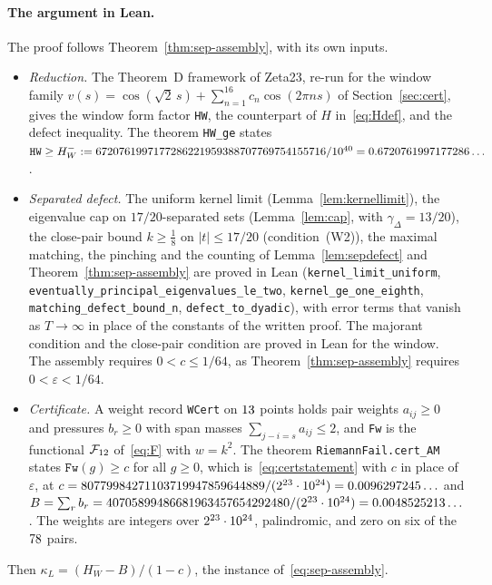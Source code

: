 \documentclass[11pt]{article}
\theoremstyle{definition}
\newcommand{\Fr}{\mathcal{F}}
\newcommand{\eps}{\varepsilon}
\begin{document}
\begin{sloppypar}
\paragraph{The argument in Lean.}
The proof follows Theorem~\ref{thm:sep-assembly}, with its own inputs.
\begin{itemize}
\item \emph{Reduction.} The Theorem~D framework of Zeta23, re-run for the
window family $v(s)=\cos(\sqrt2\,s)+\sum_{n=1}^{16}c_n\cos(2\pi ns)$ of
Section~\ref{sec:cert}, gives the window form factor \texttt{HW}, the
counterpart of $H$ in~\eqref{eq:Hdef}, and the defect inequality. The theorem
\texttt{HW\_ge} states $\texttt{HW}\ge H_W^-:=6720761997177286221959388707769754155716/10^{40}=0.6720761997177286\ldots$.
\item \emph{Separated defect.} The uniform kernel limit
(Lemma~\ref{lem:kernellimit}), the eigenvalue cap on $17/20$-separated sets
(Lemma~\ref{lem:cap}, with $\gamma_\Delta=13/20$), the close-pair bound
$k\ge\tfrac18$ on $|t|\le17/20$ (condition~(W2)), the maximal matching, the
pinching and the counting of Lemma~\ref{lem:sepdefect} and
Theorem~\ref{thm:sep-assembly} are proved in Lean
(\texttt{kernel\_limit\_uniform},
\texttt{eventually\_\allowbreak principal\_\allowbreak eigenvalues\_\allowbreak le\_two},
\texttt{kernel\_ge\_one\_eighth}, \texttt{matching\_defect\_bound\_n},
\texttt{defect\_to\_dyadic}), with error terms that vanish as $T\to\infty$ in
place of the constants of the written proof. The majorant condition and the
close-pair condition are proved in Lean for the window. The assembly requires
$0<c\le1/64$, as Theorem~\ref{thm:sep-assembly} requires $0<\eps<1/64$.
\item \emph{Certificate.} A weight record \texttt{WCert} on $13$ points
holds pair weights $a_{ij}\ge0$ and pressures $b_r\ge0$ with span masses
$\sum_{j-i=s}a_{ij}\le2$, and \texttt{Fw} is the functional $\Fr_{\qQ}$
of~\eqref{eq:F} with $w=k^2$. The theorem \texttt{RiemannFail.cert\_AM}
states $\texttt{Fw}(g)\ge c$ for all $g\ge0$, which is~\eqref{eq:certstatement} with $c$ in place of $\eps$, at
$c=80779984271103719947859644889/(2^{23}\cdot10^{24})=0.0096297245\ldots$ and
$B=\sum_rb_r=40705899486681963457654292480/(2^{23}\cdot10^{24})=0.0048525213\ldots$. The weights are integers over
$2^{23}\cdot10^{24}$, palindromic, and zero on six of the $78$ pairs.
\end{itemize}
Then $\kappa_L=(H_W^--B)/(1-c)$, the instance of~\eqref{eq:sep-assembly}.


\end{sloppypar}
\end{document}
